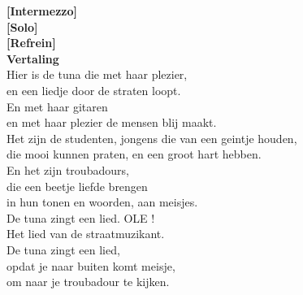 \textbf{[Intermezzo]}\\
\textbf{[Solo]}\\
\textbf{[Refrein]}\\
\vspace{10em}
\textbf{Vertaling}\\
Hier is de tuna die met haar plezier,\\
en een liedje door de straten loopt.\\
En met haar gitaren\\
en met haar plezier de mensen blij maakt.\\\vspace{1em}
Het zijn de studenten, jongens die van een geintje houden,\\
die mooi kunnen praten, en een groot hart hebben.\\
En het zijn troubadours,\\
die een beetje liefde brengen\\
in hun tonen en woorden, aan meisjes.\\\vspace{1em}
De tuna zingt een lied. OLE !\\\vspace{1em}
Het lied van de straatmuzikant.\\
De tuna zingt een lied,\\
opdat je naar buiten komt meisje,\\
om naar je troubadour te kijken.
